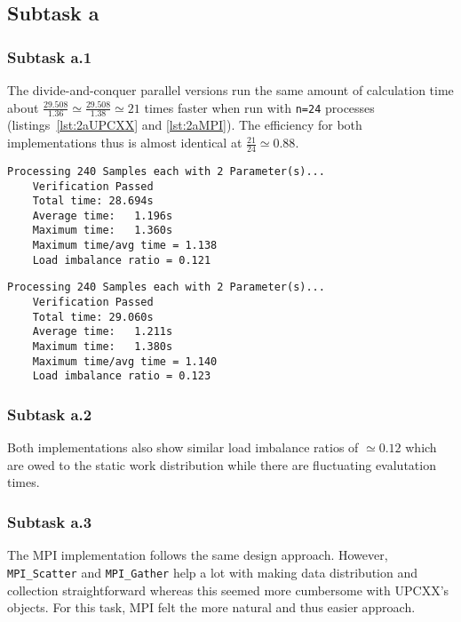 \documentclass[11pt,a4paper]{article}
\begin{document}
\subsection{Subtask a}
\subsubsection{Subtask a.1}
The divide-and-conquer parallel versions run the same amount of calculation time about $\frac{29.508}{1.36}\simeq\frac{29.508}{1.38}\simeq 21$ times
faster when run with \texttt{n=24} processes (listings~\ref{lst:2aUPCXX} and \ref{lst:2aMPI}). The efficiency for 
both implementations thus is almost identical at $\frac{21}{24}\simeq 0.88$.

\begin{lstlisting}[basicstyle=\tiny, frame=single, caption={Task 2a: UPCXX divide-and-conquer parallel implementation output (n=24).}, label={lst:2aUPCXX}]
	Processing 240 Samples each with 2 Parameter(s)...
	Verification Passed
	Total time:	28.694s
	Average time:	1.196s
	Maximum time:	1.360s
	Maximum time/avg time = 1.138
	Load imbalance ratio = 0.121
\end{lstlisting}

\begin{lstlisting}[basicstyle=\tiny, frame=single, caption={Task 2a: MPI divide-and-conquer parallel implementation output (n=24).}, label={lst:2aMPI}]
	Processing 240 Samples each with 2 Parameter(s)...
	Verification Passed
	Total time:	29.060s
	Average time:	1.211s
	Maximum time:	1.380s
	Maximum time/avg time = 1.140
	Load imbalance ratio = 0.123
\end{lstlisting}

\subsubsection{Subtask a.2}
Both implementations also show similar load imbalance ratios of $\simeq 0.12$ which are owed to the static
work distribution while there are fluctuating evalutation times.

\subsubsection{Subtask a.3}
The MPI implementation follows the same design approach. However, \texttt{MPI\_Scatter} and \texttt{MPI\_Gather} help a lot with
making data distribution and collection straightforward whereas this seemed more cumbersome with UPCXX's objects.
For this task, MPI felt the more natural and thus easier approach.
\end{document}
